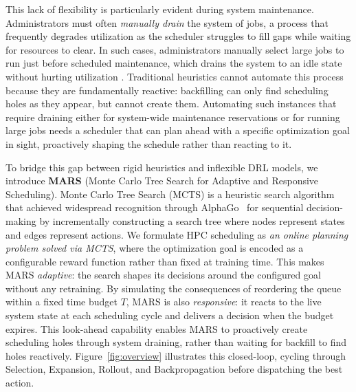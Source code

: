 \documentclass[conference]{IEEEtran}
\begin{document}
This lack of flexibility is particularly evident during system maintenance. Administrators must often \emph{manually drain} the system of jobs, a process that frequently degrades utilization as the scheduler struggles to fill gaps while waiting for resources to clear. In such cases, administrators manually select large jobs to run just before scheduled maintenance, which drains the system to an idle state without hurting utilization \cite{allcock_expatanl_2018}. Traditional heuristics cannot automate this process because they are fundamentally reactive: backfilling can only find scheduling holes as they appear, but cannot create them. Automating such instances that require draining either for system-wide maintenance reservations or for running large jobs needs a scheduler that can plan ahead with a specific optimization goal in sight, proactively shaping the schedule rather than reacting to it.

To bridge this gap between rigid heuristics and inflexible DRL models, we introduce \textbf{MARS} (Monte Carlo Tree Search for Adaptive and Responsive Scheduling). Monte Carlo Tree Search (MCTS) is a heuristic search algorithm that achieved widespread recognition through AlphaGo~\cite{silver_mastering_2017, silver_mastering_chess_shogi_2017} for sequential decision-making by incrementally constructing a search tree where nodes represent states and edges represent actions. We formulate HPC scheduling as \emph{an online planning problem solved via MCTS}, where the optimization goal is encoded as a configurable reward function rather than fixed at training time. This makes MARS \emph{adaptive}: the search shapes its decisions around the configured goal without any retraining. By simulating the consequences of reordering the queue within a fixed time budget $T$, MARS is also \emph{responsive}: it reacts to the live system state at each scheduling cycle and delivers a decision when the budget expires. This look-ahead capability enables MARS to proactively create scheduling holes through system draining, rather than waiting for backfill to find holes reactively. Figure~\ref{fig:overview} illustrates this closed-loop, cycling through Selection, Expansion, Rollout, and Backpropagation before dispatching the best action.


\end{document}
